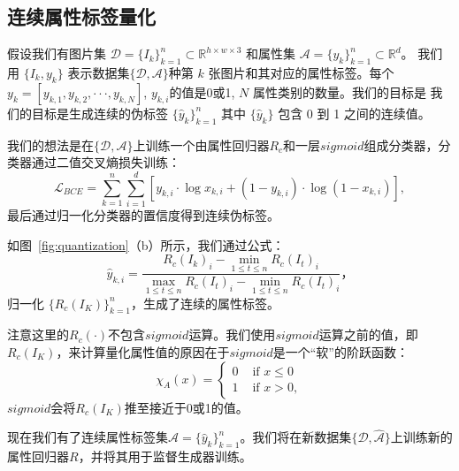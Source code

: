 \subsection{连续属性标签量化}
假设我们有图片集 $\mathcal{D} = \{I_k\}_{k=1}^n \subset \mathbb{R}^{h \times w \times 3}$ 和属性集 $\mathcal{A} = \{y_k\}_{k=1}^n \subset \mathbb{R}^{d}$。 我们用 $\{I_k, y_k\}$ 表示数据集$\{\mathcal{D}, \mathcal{A}\}$种第 $k$ 张图片和其对应的属性标签。每个$y_k=[y_{k,1}, y_{k,2}, \cdot \cdot \cdot ,y_{k,N}]$, $y_{k,i}$的值是0或1, $N$ 属性类别的数量。我们的目标是 我们的目标是生成连续的伪标签 $\{\hat{y}_k\}_{k=1}^n$ 其中 $\{\hat{y}_k\}$ 包含 0 到 1 之间的连续值。

我们的想法是在$\{\mathcal{D}, \mathcal{A}\}$上训练一个由属性回归器$R_c$和一层$sigmoid$组成分类器，分类器通过二值交叉熵损失训练：
\begin{equation}
     \mathcal{L}_{BCE} = \sum_{k=1}^n \sum_{i=1}^d [y_{k,i} \cdot \log x_{k,i}+\left(1-y_{k,i}\right) \cdot \log \left(1-x_{k,i}\right)],
\end{equation}
最后通过归一化分类器的置信度得到连续伪标签。

如图~\ref{fig:quantization}（b）所示，我们通过公式：
\begin{equation}
     \hat{y}_{k,i} = \frac{R_c(I_k)_i - \min \limits_{1 \leq t \leq n}R_c(I_t)_i}{\max \limits_{1 \leq t \leq n}R_c(I_t)_i - \min \limits_{1 \leq t \leq n}R_c(I_t)_i}，
     \label{eq3}
\end{equation}
归一化 $\{R_c(I_K)\}_{k=1}^n$，生成了连续的属性标签。

注意这里的$R_c(\cdot)$不包含$sigmoid$运算。我们使用$sigmoid$运算之前的值，即$R_c(I_K)$，来计算量化属性值的原因在于$sigmoid$是一个“软”的阶跃函数：
\begin{equation}
   \chi_{A}(x)=\left\{\begin{array}{ll}
      0 & \text { if } x \leq 0 \\
      1 & \text { if } x > 0,
      \end{array}\right.
\end{equation}
$sigmoid$会将$R_c(I_K)$推至接近于0或1的值。

现在我们有了连续属性标签集$\hat{\mathcal{A}}=\{\hat{y}_k\}_{k=1}^n$。我们将在新数据集$\{\mathcal{D}, \hat{\mathcal{A}}\}$上训练新的属性回归器$R$，并将其用于监督生成器训练。


